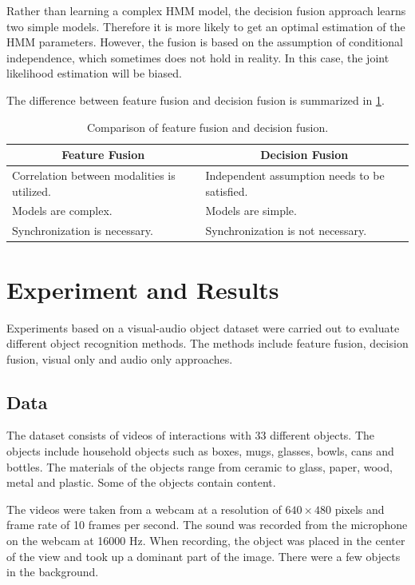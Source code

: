 \documentclass[letterpaper, 10 pt, conference]{ieeeconf}
\begin{document}
Rather than learning a complex HMM model, the decision fusion approach learns two simple models. Therefore it is more likely to get an optimal estimation of the HMM parameters. However, the fusion is based on the assumption of conditional independence, which sometimes does not hold in reality. In this case, the joint likelihood estimation will be biased.

The difference between feature fusion and decision fusion is summarized in \cref{tab:fusion}.

\begin{table}[t]
  \caption{Comparison of feature fusion and decision fusion.}
  \label{tab:fusion}
  \centering
  \begin{tabular}{p{.42\linewidth}p{.42\linewidth}}
    \toprule
    \multicolumn{1}{c}{\bfseries Feature Fusion} & \multicolumn{1}{c}{\bfseries Decision Fusion} \\ \midrule
    Correlation between modalities is utilized. & Independent assumption needs to be satisfied. \\
    Models are complex. & Models are simple. \\
    Synchronization is necessary. & Synchronization is not necessary. \\
    \bottomrule
  \end{tabular}
\end{table}

\section{Experiment and Results}
Experiments based on a visual-audio object dataset were carried out to evaluate different object recognition methods. The methods include feature fusion, decision fusion, visual only and audio only approaches.

\subsection{Data}
The dataset consists of videos of interactions with 33 different objects. The objects include household objects such as boxes, mugs, glasses, bowls, cans and bottles. The materials of the objects range from ceramic to glass, paper, wood, metal and plastic. Some of the objects contain content.

The videos were taken from a webcam at a resolution of $640 \times 480$ pixels and frame rate of 10 frames per second. The sound was recorded from the microphone on the webcam at 16000 Hz. When recording, the object was placed in the center of the view and took up a dominant part of the image. There were a few objects in the background.
\end{document}
